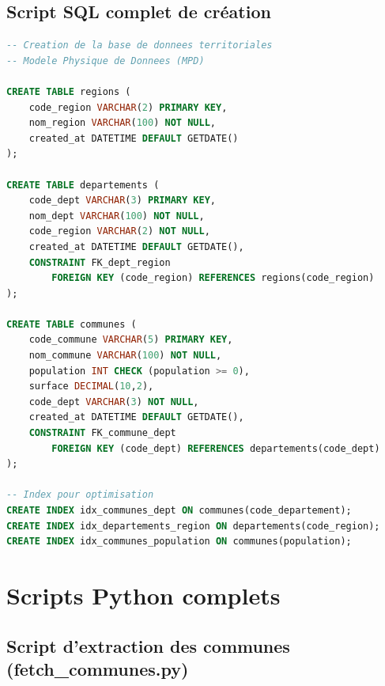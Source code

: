 \documentclass[12pt,a4paper]{article}
\begin{document}
\subsection{Script SQL complet de création}

\begin{lstlisting}[language=SQL]
-- Creation de la base de donnees territoriales
-- Modele Physique de Donnees (MPD)

CREATE TABLE regions (
    code_region VARCHAR(2) PRIMARY KEY,
    nom_region VARCHAR(100) NOT NULL,
    created_at DATETIME DEFAULT GETDATE()
);

CREATE TABLE departements (
    code_dept VARCHAR(3) PRIMARY KEY,
    nom_dept VARCHAR(100) NOT NULL,
    code_region VARCHAR(2) NOT NULL,
    created_at DATETIME DEFAULT GETDATE(),
    CONSTRAINT FK_dept_region
        FOREIGN KEY (code_region) REFERENCES regions(code_region)
);

CREATE TABLE communes (
    code_commune VARCHAR(5) PRIMARY KEY,
    nom_commune VARCHAR(100) NOT NULL,
    population INT CHECK (population >= 0),
    surface DECIMAL(10,2),
    code_dept VARCHAR(3) NOT NULL,
    created_at DATETIME DEFAULT GETDATE(),
    CONSTRAINT FK_commune_dept
        FOREIGN KEY (code_dept) REFERENCES departements(code_dept)
);

-- Index pour optimisation
CREATE INDEX idx_communes_dept ON communes(code_departement);
CREATE INDEX idx_departements_region ON departements(code_region);
CREATE INDEX idx_communes_population ON communes(population);
\end{lstlisting}

\section{Scripts Python complets}
\label{annexe:scripts}

\subsection{Script d'extraction des communes (fetch\_communes.py)}
\label{annexe:fetch_communes}
\end{document}
